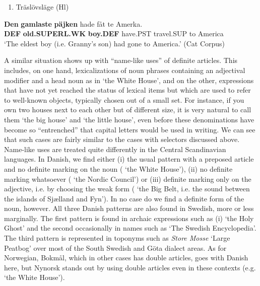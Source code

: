 \begin{enumerate} %
\item 
Träslövsläge (Hl)

\end{enumerate} %
\ea\label{}
\gll \textbf{Den}\textbf{  gamlaste}\textbf{  päjken} hade  fåt  te  Amerka.\\


\textbf{DEF} \textbf{old.SUPERL.WK} \textbf{boy.DEF} have.PST  travel.SUP  to  America\\ %


‘The eldest boy (i.e. Granny’s son) had gone to America.’ (Cat Corpus)
\z


A similar situation shows up with “name-like uses” of definite articles. This includes, on one hand, lexicalizations of noun phrases containing an adjectival modifier and a head noun as in  ‘the White House’, and on the other, expressions that have not yet reached the status of lexical items but which are used to refer to well-known objects, typically chosen out of a small set. For instance, if you own two houses next to each other but of different size, it is very natural to call them  ‘the big house’ and  ‘the little house’, even before these denominations have become so “entrenched” that capital letters would be used in writing. We can see that such cases are fairly similar to the cases with selectors discussed above. Name-like uses are treated quite differently in the Central Scandinavian languages. In Danish, we find either (i) the usual pattern with a preposed article and no definite marking on the noun ( ‘the White House’), (ii) no definite marking whatsoever ( ‘the Nordic Council’) or (iii) definite marking only on the adjective, i.e. by choosing the weak form ( ‘the Big Belt, i.e. the sound between the islands of Sjælland and Fyn’). In no case do we find a definite form of the noun, however. All three Danish patterns are also found in Swedish, more or less marginally. The first pattern is found in archaic expressions such as (i)  ‘the Holy Ghost’ and the second occasionally in names such as   ‘The Swedish Encyclopedia’. The third pattern is represented in toponyms such as \textit{Store Mosse} ‘Large Peatbog’ over most of the South Swedish and Göta dialect areas. As for Norwegian, Bokmål, which in other cases has double articles, goes with Danish here, but Nynorsk stands out by using double articles even in these contexts (e.g.  ‘the White House’). 


